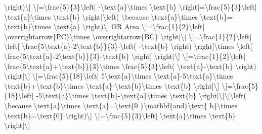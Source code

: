 \textbackslash right)\textbackslash{]} \textbackslash{[}=\textbackslash frac\{5\}\{3\}\textbackslash left|
-\textbackslash text\{a\}\textbackslash times \textbackslash text\{b\}
\textbackslash right|=\textbackslash frac\{5\}\{3\}\textbackslash left|
\textbackslash text\{a\}\textbackslash times \textbackslash text\{b\}
\textbackslash right|\textbackslash left( \textbackslash because
\textbackslash text\{a\}\textbackslash times \textbackslash text\{b\}=-\textbackslash text\{b\}\textbackslash times
\textbackslash text\{a\} \textbackslash right)\textbackslash{]}
OR Area \textbackslash{[}=\textbackslash frac\{1\}\{2\}\textbackslash left|
\textbackslash overrightarrow\{PC\}\textbackslash times \textbackslash overrightarrow\{BC\}
\textbackslash right|\textbackslash{]} \textbackslash{[}=\textbackslash frac\{1\}\{2\}\textbackslash left|
\textbackslash left{[} \textbackslash frac\{5\textbackslash text\{a\}-2\textbackslash text\{b\}\}\{3\}-\textbackslash left(
-\textbackslash text\{b\} \textbackslash right) \textbackslash right{]}\textbackslash times
\textbackslash left{[} \textbackslash frac\{5\textbackslash text\{a\}-2\textbackslash text\{b\}\}\{3\}-\textbackslash text\{b\}
\textbackslash right{]} \textbackslash right|\textbackslash{]}
\textbackslash{[}=\textbackslash frac\{1\}\{2\}\textbackslash left|
\textbackslash frac\{5\textbackslash text\{a\}+\textbackslash text\{b\}\}\{3\}\textbackslash times
\textbackslash frac\{5\}\{3\}\textbackslash left( \textbackslash text\{a\}-\textbackslash text\{b\}
\textbackslash right) \textbackslash right|\textbackslash{]} \textbackslash{[}=\textbackslash frac\{5\}\{18\}\textbackslash left|
5\textbackslash text\{a\}\textbackslash times \textbackslash text\{a\}-5\textbackslash text\{a\}\textbackslash times
\textbackslash text\{b\}+\textbackslash text\{b\}\textbackslash times
\textbackslash text\{a\}-\textbackslash text\{b\}\textbackslash times
\textbackslash text\{b\} \textbackslash right|\textbackslash{]}
\textbackslash{[}=\textbackslash frac\{5\}\{18\}\textbackslash left|
-5\textbackslash text\{a\}\textbackslash times \textbackslash text\{b\}-\textbackslash text\{a\}\textbackslash times
\textbackslash text\{b\} \textbackslash right|\textbackslash{]}\textbackslash{[}\textbackslash left(
\textbackslash because \textbackslash text\{a\}\textbackslash times
\textbackslash text\{a\}=\textbackslash text\{0 \}\textbackslash mathbf\{and\}\textbackslash text\{
b\}\textbackslash times \textbackslash text\{b\}=\textbackslash text\{0\}
\textbackslash right)\textbackslash{]} \textbackslash{[}=\textbackslash frac\{5\}\{3\}\textbackslash left|
\textbackslash text\{a\}\textbackslash times \textbackslash text\{b\}
\textbackslash right|\textbackslash{]} 

